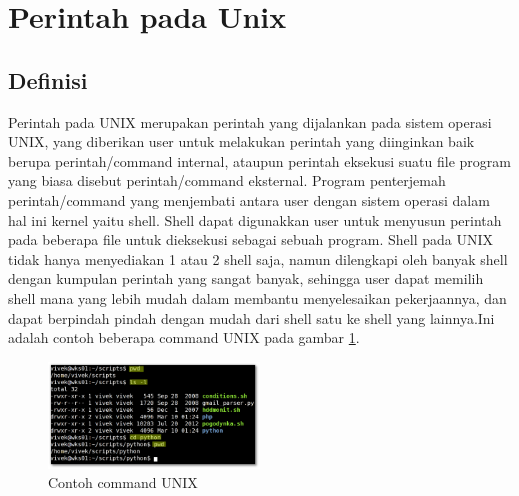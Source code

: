

	\section{Perintah pada Unix}
		\subsection{Definisi}
		\hspace*{1cm}Perintah pada UNIX merupakan perintah yang dijalankan pada sistem operasi UNIX, yang diberikan user untuk melakukan perintah yang diinginkan baik berupa perintah/command internal, ataupun perintah eksekusi suatu file program yang biasa disebut perintah/command eksternal. Program penterjemah perintah/command yang menjembati antara user dengan sistem operasi dalam hal ini kernel yaitu shell. Shell dapat digunakkan user untuk menyusun perintah pada beberapa file untuk dieksekusi sebagai sebuah program. Shell pada UNIX tidak hanya menyediakan 1 atau 2 shell saja, namun dilengkapi oleh banyak shell dengan kumpulan perintah yang sangat banyak, sehingga user dapat memilih shell mana yang lebih mudah dalam membantu menyelesaikan pekerjaannya, dan dapat berpindah pindah dengan mudah dari shell satu ke shell yang lainnya.Ini adalah contoh beberapa command UNIX pada gambar \ref{command}.
		
		\begin{figure}[ht]
			\centerline{\includegraphics[width=0.5\textwidth]{figures/command.png}}
			\caption{Contoh command UNIX}
			\label{command}
			\end{figure}
		

